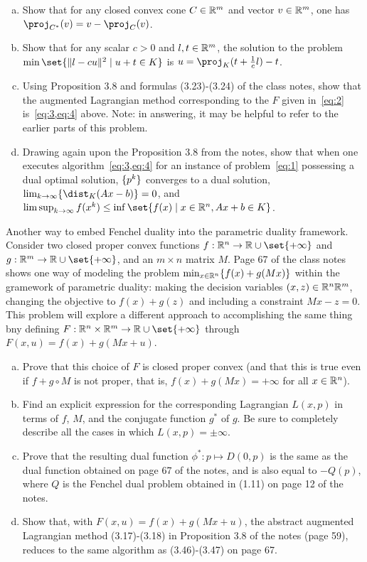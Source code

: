 \documentclass{article}
\begin{document}
\begin{problem}
\begin{enumerate}[(a)]
        \item Show that for any closed convex cone $C\in\mathbb{R}^m$ and vector $v\in\mathbb{R}^m$, one has $\proj_{C^*}(v)=v-\proj_C(v)$.
        \item Show that for any scalar $c>0$ and $l,t\in\mathbb{R}^m$, the solution to the problem $\min\set{\norm{l-cu}^2\mid u+t\in K}$ is $u=\proj_K(t+\frac{1}{c}l)-t$.
        \item Using Proposition 3.8 and formulas (3.23)-(3.24) of the class notes, show that the augmented Lagrangian method corresponding to the $F$ given in~\cref{eq:2} is~\cref{eq:3,eq:4} above. Note: in answering, it may be helpful to refer to the earlier parts of this problem.
        \item Drawing again upon the Proposition 3.8 from the notes, show that when one executes algorithm~\cref{eq:3,eq:4} for an instance of problem~\cref{eq:1} possessing a dual optimal solution, $\lbrace p^k\rbrace$ converges to a dual solution, $\lim_{k\rightarrow\infty}\braces{\dist_K(Ax-b)}=0$, and $\lim\sup_{k\rightarrow\infty}f(x^k)\leq\inf\set{f(x)\mid x\in\R^n, Ax+b\in K}$.
    \end{enumerate}
\end{problem}

\begin{problem}
    {Another way to embed Fenchel duality into the parametric duality framework.}
    Consider two closed proper convex functions $f:\R^n\rightarrow\R\cup\set{+\infty}$ and $g:\R^m\rightarrow\R\cup\set{+\infty}$, and an $m\times n$ matrix $M$. Page 67 of the class notes shows one way of modeling the problem $\min_{x\in\mathbb{R}^n}\lbrace f(x)+g(Mx)\rbrace$ within the gramework of parametric duality: making the decision variables $(x,z)\in\mathbb{R}^n\mathbb{R}^m$, changing the objective to $f(x)+g(z)$ and including a constraint $Mx-z=0$. This problem will explore a different approach to accomplishing the same thing bny defining $F:\R^n\times\R^m\rightarrow\R\cup\set{+\infty}$ through $F(x,u)=f(x)+g(Mx+u)$.
    \begin{enumerate}[(a)]
        \item Prove that this choice of $F$ is closed proper convex (and that this is true even if $f+g\circ M$ is not proper, that is, $f(x)+g(Mx)=+\infty$ for all $x\in\mathbb{R}^n$).
        \item Find an explicit expression for the corresponding Lagrangian $L(x,p)$ in terms of $f$, $M$, and the conjugate function $g^*$ of $g$. Be sure to completely describe all the cases in which $L(x,p)=\pm\infty$.
        \item Prove that the resulting dual function $\phi^*:p\mapsto D(0,p)$ is the same as the dual function obtained on page 67 of the notes, and is also equal to $-Q(p)$, where $Q$ is the Fenchel dual problem obtained in (1.11) on page 12 of the notes.
        \item Show that, with $F(x,u)=f(x)+g(Mx+u)$, the abstract augmented Lagrangian method (3.17)-(3.18) in Proposition 3.8 of the notes (page 59), reduces to the same algorithm as (3.46)-(3.47) on page 67.
    \end{enumerate}
\end{problem}
\end{document}
